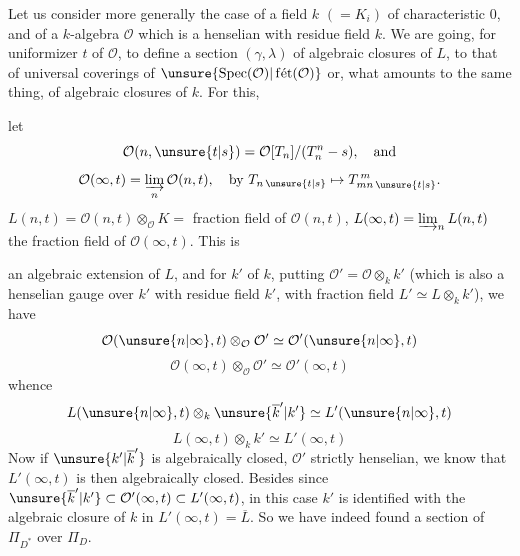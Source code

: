 


Let us consider more generally the case of a field $k$ $(=K_i)$ of characteristic $0$, and of a  $k$-algebra $\mathcal{O}$ which is a henselian  with residue field $k$.
We are going, for  uniformizer $t$ of $\mathcal{O}$, to define a section $(\gamma,\lambda)$     of algebraic closures of $L$, to that of universal coverings of $\unsure{\operatorname{Spec}(\mathcal{O})|\operatorname{f\acute{e}t}(\mathcal{O})}$ or, what amounts to the same thing, of algebraic closures of $k$. For this,

let
\[
\mathcal{O}(n,\unsure{t|s})=\mathcal{O}[T_n]/(T_n^n-s),\quad\text{and}
\]
\[
\mathcal{O}(\infty,t)=\varinjlim_n\mathcal{O}(n,t),\quad
\text{by }T_{n\,\unsure{t|s}}\mapsto T_{mn\,\unsure{t|s}}^{\,m}.
\]
$L(n,t)=\mathcal{O}(n,t)\otimes_{\mathcal{O}}K=$ fraction field of $\mathcal{O}(n,t)$, $L(\infty,t)=\varinjlim_n L(n,t)$ the fraction field of $\mathcal{O}(\infty,t)$. This is



an algebraic extension of $L$, and for    $k'$ of $k$, putting $\mathcal{O}'=\mathcal{O}\otimes_k k'$ (which is also a henselian gauge over $k'$ with residue field $k'$, with fraction field $L'\simeq L\otimes_k k'$), we have  
\[
\mathcal{O}(\unsure{n|\infty},t)\otimes_{\mathcal{O}}\mathcal{O}'\simeq\mathcal{O}'(\unsure{n|\infty},t)
\]
\[
\mathcal{O}(\infty,t)\otimes_{\mathcal{O}}\mathcal{O}'\simeq\mathcal{O}'(\infty,t)
\]
whence
\[
L(\unsure{n|\infty},t)\otimes_k\unsure{\overline{k}'|k'}\simeq L'(\unsure{n|\infty},t)
\]
\[
L(\infty,t)\otimes_k k'\simeq L'(\infty,t)
\]
Now if $\unsure{k'|\overline{k}'}$ is algebraically closed,  $\mathcal{O}'$ strictly henselian, we know that $L'(\infty,t)$ is then algebraically closed.
Besides  since $\unsure{\overline{k}'|k'}\subset\mathcal{O}'(\infty,t)\subset L'(\infty,t)$, in this case  $k'$  is identified with the algebraic closure  of $k$ in $L'(\infty,t)=\overline{L}$.
So we have indeed found a section of $\Pi_{D^*}$ over $\Pi_D$.

